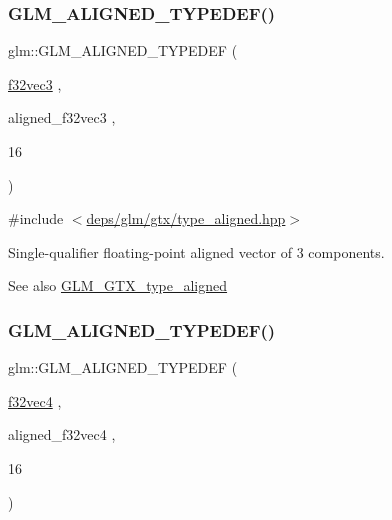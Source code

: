 \subsubsection{\texorpdfstring{G\+L\+M\+\_\+\+A\+L\+I\+G\+N\+E\+D\+\_\+\+T\+Y\+P\+E\+D\+E\+F()}{GLM\_ALIGNED\_TYPEDEF()}\hspace{0.1cm}{\footnotesize\ttfamily [153/209]}}
{\footnotesize\ttfamily glm\+::\+G\+L\+M\+\_\+\+A\+L\+I\+G\+N\+E\+D\+\_\+\+T\+Y\+P\+E\+D\+EF (\begin{DoxyParamCaption}\item[{\hyperlink{group__gtc__type__precision_ga4d08db2a75d1e8f85e0edbbd76f18ecf}{f32vec3}}]{,  }\item[{aligned\+\_\+f32vec3}]{,  }\item[{16}]{ }\end{DoxyParamCaption})}



{\ttfamily \#include $<$\hyperlink{gtx_2type__aligned_8hpp}{deps/glm/gtx/type\+\_\+aligned.\+hpp}$>$}

Single-\/qualifier floating-\/point aligned vector of 3 components. \begin{DoxySeeAlso}{See also}
\hyperlink{group__gtx__type__aligned}{G\+L\+M\+\_\+\+G\+T\+X\+\_\+type\+\_\+aligned} 
\end{DoxySeeAlso}
\mbox{\label{group__gtx__type__aligned_ga2e8a12c5e6a9c4ae4ddaeda1d1cffe3b}} 
\subsubsection{\texorpdfstring{G\+L\+M\+\_\+\+A\+L\+I\+G\+N\+E\+D\+\_\+\+T\+Y\+P\+E\+D\+E\+F()}{GLM\_ALIGNED\_TYPEDEF()}\hspace{0.1cm}{\footnotesize\ttfamily [154/209]}}
{\footnotesize\ttfamily glm\+::\+G\+L\+M\+\_\+\+A\+L\+I\+G\+N\+E\+D\+\_\+\+T\+Y\+P\+E\+D\+EF (\begin{DoxyParamCaption}\item[{\hyperlink{group__gtc__type__precision_ga03e165a8b1ffe77625530fa335699e06}{f32vec4}}]{,  }\item[{aligned\+\_\+f32vec4}]{,  }\item[{16}]{ }\end{DoxyParamCaption})}



